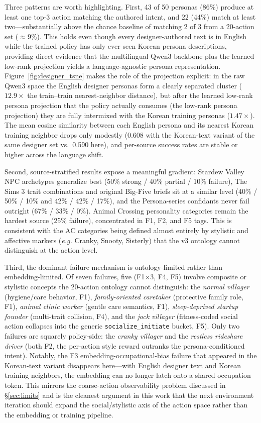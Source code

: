 \documentclass[conference]{IEEEtran}
\newcommand{\eg}{\textit{e.g.}\xspace}
\begin{document}
Three patterns are worth highlighting. First, 43 of 50 personas
(86\%) produce at least one top-3 action matching the authored intent, and
$22$ (44\%) match at least two---substantially above the chance baseline of
matching 2 of 3 from a 20-action set ($\approx\!9\%$). This holds even though
every designer-authored text is in English while the trained policy has only
ever seen Korean persona descriptions, providing direct evidence that the
multilingual Qwen3 backbone plus the learned low-rank projection yields a
language-agnostic persona representation. Figure~\ref{fig:designer_tsne}
makes the role of the projection explicit: in the raw Qwen3 space the English
designer personas form a clearly separated cluster ($12.9\times$ the
train--train nearest-neighbor distance), but after the learned low-rank persona projection
that the policy actually consumes (the low-rank persona projection) they are
fully intermixed with the Korean training personas ($1.47\times$). The mean cosine similarity between each
English persona and its nearest Korean training neighbor drops only modestly
(0.608 with the Korean-text variant of the same designer set vs.\ 0.590 here),
and per-source success rates are stable or higher across the language shift.

Second, source-stratified results expose a meaningful gradient: Stardew Valley
NPC archetypes generalize best (50\% strong / 40\% partial / 10\% failure),
The Sims 3 trait combinations and original Big-Five briefs sit at a similar
level (40\% / 50\% / 10\% and 42\% / 42\% / 17\%), and the Persona-series
confidants never fail outright (67\% / 33\% / 0\%). Animal Crossing personality
categories remain the hardest source (25\% failure), concentrated in F1, F2,
and F5 tags. This is consistent with the AC categories being defined almost
entirely by stylistic and affective markers (\eg Cranky, Snooty, Sisterly)
that the v3 ontology cannot distinguish at the action level.

Third, the dominant failure mechanism is ontology-limited rather than
embedding-limited. Of seven failures, five (F1$\times$3, F4, F5) involve
composite or stylistic concepts the 20-action ontology cannot distinguish:
the \emph{normal villager} (hygiene/care behavior, F1),
\emph{family-oriented caretaker} (protective family role, F1),
\emph{animal clinic worker} (gentle care semantics, F1),
\emph{sleep-deprived startup founder} (multi-trait collision, F4), and the
\emph{jock villager} (fitness-coded social action collapses into the generic
\texttt{socialize\_initiate} bucket, F5). Only two failures are squarely
policy-side: the \emph{cranky villager} and the \emph{restless rideshare
driver} (both F2, the per-action style reward outranks the persona-conditioned
intent). Notably, the F3 embedding-occupational-bias failure that appeared
in the Korean-text variant disappears here---with English designer text and
Korean training neighbors, the embedding can no longer latch onto a shared
occupation token. This mirrors the coarse-action observability problem
discussed in \S\ref{sec:limits} and is the cleanest argument in this work
that the next environment iteration should expand the social/stylistic axis
of the action space rather than the embedding or training pipeline.
\end{document}
